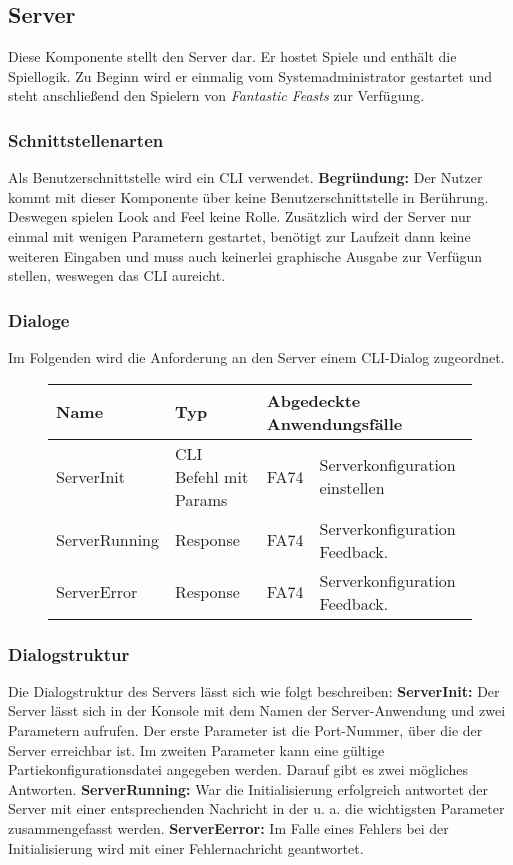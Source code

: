 \subsection{Server}
Diese Komponente stellt den Server dar. Er hostet Spiele und enthält die Spiellogik. Zu Beginn wird er einmalig vom Systemadministrator gestartet und steht anschließend den Spielern von \textit{Fantastic Feasts} zur Verfügung.

\subsubsection{Schnittstellenarten}
Als Benutzerschnittstelle wird ein CLI verwendet. \textbf{Begründung:} Der Nutzer kommt mit dieser Komponente über keine Benutzerschnittstelle in Berührung. Deswegen spielen Look and Feel keine Rolle. Zusätzlich wird der Server nur einmal mit wenigen Parametern gestartet, benötigt zur Laufzeit dann keine weiteren Eingaben und muss auch keinerlei graphische Ausgabe zur Verfügun stellen, weswegen das CLI aureicht.

\subsubsection{Dialoge}
Im Folgenden wird die Anforderung an den Server einem CLI-Dialog zugeordnet.

\begin{figure}[H]
    \centering
    \begin{tabular}{| l l l l |}
    \hline
    \textbf{Name} & \textbf{Typ} & \multicolumn{2}{l|}{\textbf{Abgedeckte Anwendungsfälle}} \\\hline
    ServerInit & CLI Befehl mit Params & FA74 & Serverkonfiguration einstellen \\\hline
    ServerRunning & Response & FA74 & Serverkonfiguration Feedback.\\\hline
    ServerError & Response & FA74 & Serverkonfiguration Feedback.\\\hline
    
    \end{tabular}
\end{figure}

\subsubsection{Dialogstruktur}  
Die Dialogstruktur des Servers lässt sich wie folgt beschreiben: \textbf{ServerInit:} Der Server lässt sich in der Konsole mit dem Namen der Server-Anwendung und zwei Parametern aufrufen. Der erste Parameter ist die Port-Nummer, über die der Server erreichbar ist. Im zweiten Parameter kann eine gültige Partiekonfigurationsdatei angegeben werden. Darauf gibt es zwei mögliches Antworten. \textbf{ServerRunning:} War die Initialisierung erfolgreich antwortet der Server mit einer entsprechenden Nachricht in der u. a. die wichtigsten Parameter zusammengefasst werden. \textbf{ServerEerror:} Im Falle eines Fehlers bei der Initialisierung wird mit einer Fehlernachricht geantwortet.



